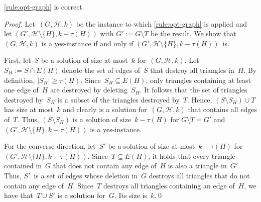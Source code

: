 \documentclass[envcountsame,numbook,smallextended]{svjour3}
\numberwithin{equation}{section}
\numberwithin{figure}{section}
\newcommand{\packing}{\ensuremath{\mathcal H}}
\begin{document}
\begin{lemma}\label{lem:opt-graph-correct}
  \cref{rule:opt-graph} is correct. 
\end{lemma}
\begin{proof}
  Let~$(G,\packing,k)$ be the instance
  to which \cref{rule:opt-graph} is applied and let $(G',\packing\setminus\{H\},k-\tau(H))$ with \(G':=G\setminus T\) be the result. We show that~$(G,\packing,k)$ is a yes-instance if and only if $(G',\packing\setminus\{H\},k-\tau(H))$~is.

  First, let~$S$ be a solution of size at most~$k$ for~$(G,\packing,k)$. Let~$S_H:=S\cap E(H)$ denote the set of edges of~$S$ that destroy all triangles in~$H$. By definition, $|S_H|\ge \tau(H)$.  Since~$S_H\subseteq E(H)$, only triangles containing at least one edge of~$H$ are destroyed by deleting~$S_H$. It follows that the set of triangles destroyed by~$S_H$ is a subset of the triangles destroyed by~$T$.  Hence, $(S\setminus S_H)\cup T$ has size at most~$k$ and clearly is a solution for~$(G,\packing,k)$ that contains all edges of~$T$. Thus, \((S\setminus S_H)\) is a solution of size~\(k-\tau(H)\) for \(G\setminus T=G'\) and $(G',\packing\setminus\{H\},k-\tau(H))$ is a yes-instance.

  For the converse direction, let~$S'$ be a solution of size at most~$k-\tau(H)$ for~$(G',\packing\setminus\{H\},k-\tau(H))$. Since~$T\subseteq E(H)$, it holds that every triangle contained in~$G$ that does not contain any edge of~$H$ is also a triangle in~$G'$.  Thus, $S'$~is a set of edges whose deletion in~$G$ destroys all triangles that do not contain any edge of~$H$. Since~$T$ destroys all triangles containing an edge of~$H$, we have that~$T\cup S'$ is a solution for~$G$.  Its size is~\(k\).\qed
\end{proof}
\end{document}
